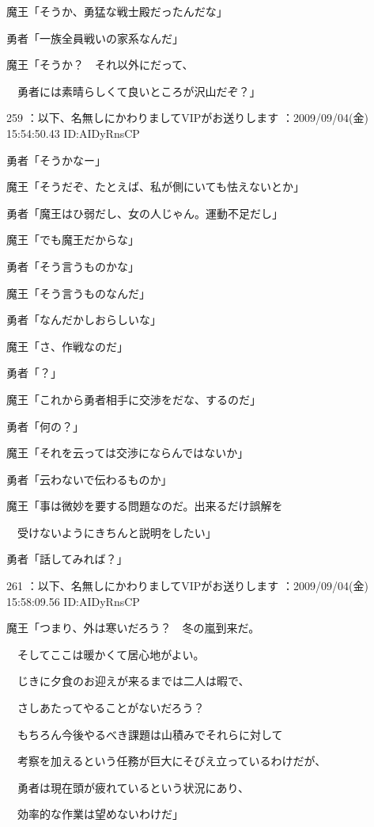 \documentclass[a4j,twocolumn]{tarticle}
\begin{document}
魔王「そうか、勇猛な戦士殿だったんだな」 



勇者「一族全員戦いの家系なんだ」 



魔王「そうか？　それ以外にだって、\par{} 
　勇者には素晴らしくて良いところが沢山だぞ？」 

	
    
    

259 ：以下、名無しにかわりましてVIPがお送りします ：2009/09/04(金) 15:54:50.43 ID:AIDyRnsCP 


勇者「そうかなー」\par{} 
魔王「そうだぞ、たとえば、私が側にいても怯えないとか」\par{} 
勇者「魔王はひ弱だし、女の人じゃん。運動不足だし」 



魔王「でも魔王だからな」\par{} 
勇者「そう言うものかな」\par{} 
魔王「そう言うものなんだ」 



勇者「なんだかしおらしいな」\par{} 
魔王「さ、作戦なのだ」\par{} 
勇者「？」 



魔王「これから勇者相手に交渉をだな、するのだ」\par{} 
勇者「何の？」 



魔王「それを云っては交渉にならんではないか」\par{} 
勇者「云わないで伝わるものか」 



魔王「事は微妙を要する問題なのだ。出来るだけ誤解を\par{} 
　受けないようにきちんと説明をしたい」\par{} 
勇者「話してみれば？」 

	
    
    

261 ：以下、名無しにかわりましてVIPがお送りします ：2009/09/04(金) 15:58:09.56 ID:AIDyRnsCP 


魔王「つまり、外は寒いだろう？　冬の嵐到来だ。\par{} 
　そしてここは暖かくて居心地がよい。\par{} 
　じきに夕食のお迎えが来るまでは二人は暇で、\par{} 
　さしあたってやることがないだろう？\par{} 
　もちろん今後やるべき課題は山積みでそれらに対して\par{} 
　考察を加えるという任務が巨大にそびえ立っているわけだが、\par{} 
　勇者は現在頭が疲れているという状況にあり、\par{} 
　効率的な作業は望めないわけだ」 
\end{document}
